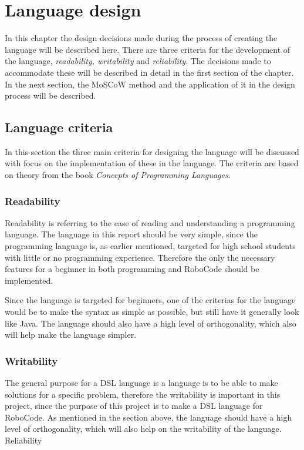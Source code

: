 \chapter{Language design}
In this chapter the design decisions made during the process of creating the language will be described here. There are three criteria for the development of the language, \emph{readability, writability} and \emph{reliability}. The decisions made to accommodate these will be described in detail in the first section of the chapter. 
In the next section, the MoSCoW method and the application of it in the design process will be described. 
 
\section{Language criteria}
In this section the three main criteria for designing the language will be discussed with focus on the implementation of these in the language. The criteria are based on theory from the book \emph{Concepts of Programming Languages}\citep{Sebesta}.

\subsection{Readability}
Readability is referring to the ease of reading and understanding a programming language. The language in this report should be very simple, since the programming language is, as earlier mentioned, targeted for high school students with little or no programming experience. Therefore the only the necessary features for a beginner in both programming and RoboCode should be implemented. 

Since the language is targeted for beginners, one of the criterias for the language would be to make the syntax as simple as possible, but still have it generally look like Java. The language should also have a high level of orthogonality, which also will help make the language simpler. 

\subsection{Writability}
The general purpose for a DSL language is a language is to be able to make solutions for a specific problem, therefore the writability is important in this project, since the purpose of this project is to make a DSL language for RoboCode. As mentioned in the section above, the language should have a high level of orthogonality, which will also help on  the writability of the language. 
Reliability

